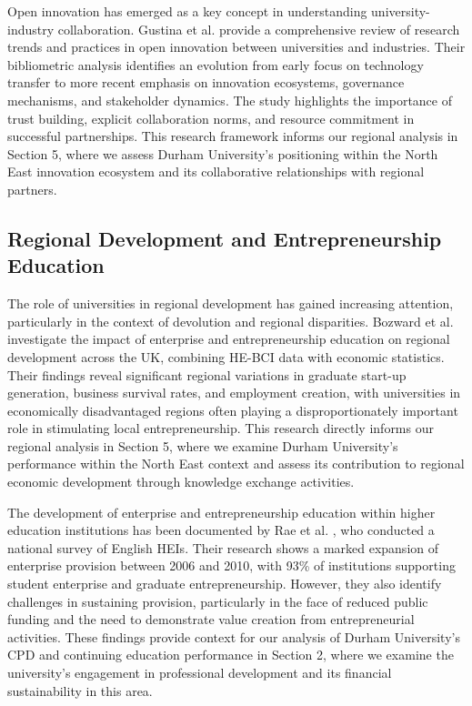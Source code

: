 \documentclass[journal,onecolumn, 10pt,draftclsnofoot]{IEEEtran}
\begin{document}
Open innovation has emerged as a key concept in understanding university-industry collaboration. Gustina et al. \cite{gustina2024open} provide a comprehensive review of research trends and practices in open innovation between universities and industries. Their bibliometric analysis identifies an evolution from early focus on technology transfer to more recent emphasis on innovation ecosystems, governance mechanisms, and stakeholder dynamics. The study highlights the importance of trust building, explicit collaboration norms, and resource commitment in successful partnerships. This research framework informs our regional analysis in Section 5, where we assess Durham University's positioning within the North East innovation ecosystem and its collaborative relationships with regional partners.

\subsection{Regional Development and Entrepreneurship Education}

The role of universities in regional development has gained increasing attention, particularly in the context of devolution and regional disparities. Bozward et al. \cite{bozward2021impact} investigate the impact of enterprise and entrepreneurship education on regional development across the UK, combining HE-BCI data with economic statistics. Their findings reveal significant regional variations in graduate start-up generation, business survival rates, and employment creation, with universities in economically disadvantaged regions often playing a disproportionately important role in stimulating local entrepreneurship. This research directly informs our regional analysis in Section 5, where we examine Durham University's performance within the North East context and assess its contribution to regional economic development through knowledge exchange activities.

The development of enterprise and entrepreneurship education within higher education institutions has been documented by Rae et al. \cite{rae2012enterprise}, who conducted a national survey of English HEIs. Their research shows a marked expansion of enterprise provision between 2006 and 2010, with 93\% of institutions supporting student enterprise and graduate entrepreneurship. However, they also identify challenges in sustaining provision, particularly in the face of reduced public funding and the need to demonstrate value creation from entrepreneurial activities. These findings provide context for our analysis of Durham University's CPD and continuing education performance in Section 2, where we examine the university's engagement in professional development and its financial sustainability in this area.
\end{document}

